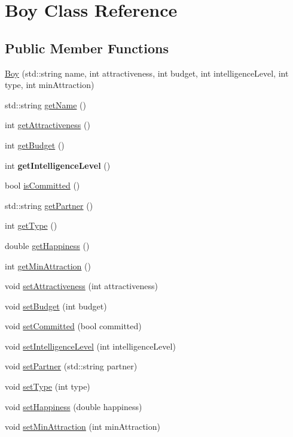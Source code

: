 \hypertarget{class_boy}{}\section{Boy Class Reference}
\label{class_boy}
\subsection*{Public Member Functions}
\begin{DoxyCompactItemize}
\item 
\hyperlink{class_boy_a0a51d40be8680589d7ed43a64959fc8b}{Boy} (std\+::string name, int attractiveness, int budget, int intelligence\+Level, int type, int min\+Attraction)
\item 
std\+::string \hyperlink{class_boy_acf59fd0074a6ea3413751a95b2970303}{get\+Name} ()
\item 
int \hyperlink{class_boy_a814ef4919f2ac86c6ee70f9698afad3d}{get\+Attractiveness} ()
\item 
int \hyperlink{class_boy_a05c48b12091ebcad44ba86ba88514ac5}{get\+Budget} ()
\item 
\mbox{\label{class_boy_a62c95b320fb02474cb339ddba96014d8}} 
int {\bfseries get\+Intelligence\+Level} ()
\item 
bool \hyperlink{class_boy_a2aaabbf515640f59d44638b3ec7837b8}{is\+Committed} ()
\item 
std\+::string \hyperlink{class_boy_ae7faa071153b463f2a7424650b1f6db3}{get\+Partner} ()
\item 
int \hyperlink{class_boy_a65dcb5946aa7d736f15d7ca8d892dab7}{get\+Type} ()
\item 
double \hyperlink{class_boy_a7ab7e61631b30e7f679ba204f3b2616d}{get\+Happiness} ()
\item 
int \hyperlink{class_boy_a35d84533352a88f6365a28ba21b9f993}{get\+Min\+Attraction} ()
\item 
void \hyperlink{class_boy_a402b2082685030f1484f1c9940f4e977}{set\+Attractiveness} (int attractiveness)
\item 
void \hyperlink{class_boy_adb0aa7b4399c4d463129be2b2b9c3b42}{set\+Budget} (int budget)
\item 
void \hyperlink{class_boy_a6af3e7642f17781764a7aae58568d5c7}{set\+Committed} (bool committed)
\item 
void \hyperlink{class_boy_ad1eea5f50af9763a810bff01bb0a80e2}{set\+Intelligence\+Level} (int intelligence\+Level)
\item 
void \hyperlink{class_boy_a1762597ae2a5423ccb1583893b6622f6}{set\+Partner} (std\+::string partner)
\item 
void \hyperlink{class_boy_a7936f0d137ab929e118043a80067e43e}{set\+Type} (int type)
\item 
void \hyperlink{class_boy_a4de551a1a85cd44f8955ef3eea50eb0e}{set\+Happiness} (double happiness)
\item 
void \hyperlink{class_boy_a9e39b3cb4cbc2c0827a34410d9f826fc}{set\+Min\+Attraction} (int min\+Attraction)
\end{DoxyCompactItemize}


